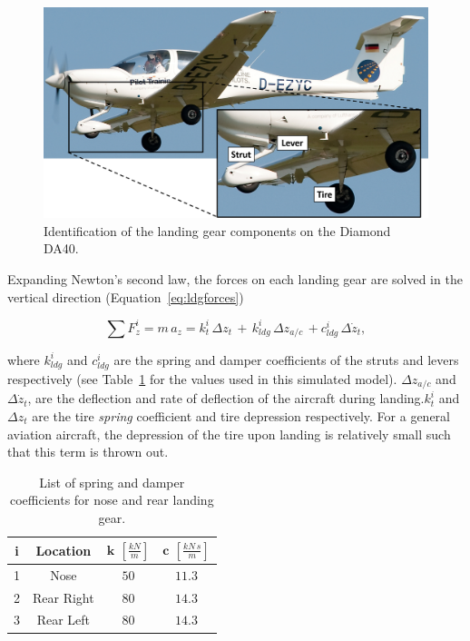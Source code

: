 \documentclass[12pt]{report}
\begin{document}
\begin{figure}[!ht]\label{fig:ldg}
  \centering
  \includegraphics[width=.75\linewidth]{Figures/LandingGear.png}
  \caption{Identification of the landing gear components on the Diamond DA40.}
\end{figure}

Expanding Newton's second law, the forces on each landing gear are solved in the vertical direction (Equation~\ref{eq:ldgforces})

\begin{equation}
  \sum F^i_z = m\,a_z = k^i_t\, \Delta z_t\, + \, k^i_{ldg}\, \Delta z_{a/c}\, + c^i_{ldg}\, \Delta \dot{z}_t,
  \label{eq:ldgforces}
\end{equation}

where \(k^i_{ldg}\) and \(c^i_{ldg}\) are the spring and damper coefficients of the struts and levers respectively (see Table~\ref{tbl:ldgcoeff} for the values used in this simulated model). \(\Delta z_{a/c}\) and \(\Delta \dot{z}_t\), are the deflection and rate of deflection of the aircraft during landing.\( k^i_t \) and \(\Delta z_t\) are the tire \textit{spring} coefficient and tire depression respectively. For a general aviation aircraft, the depression of the tire upon landing is relatively small such that this term is thrown out.

\begin{table}[!ht]\label{tbl:ldgcoeff}
  \caption{List of spring and damper coefficients for nose and rear landing gear.}
  \centering
  \begin{tabular}{cccc}
    \toprule
    \textbf{i} & \textbf{Location} & \(\mathbf{k}\) \(  \left[\frac{kN}{m}\right]\) & \(\mathbf{c}\) \( \left[\frac{kN\,s}{m}\right]\) \\
    \midrule
    1          & Nose              & \(50\)                                         & \(11.3\)                                         \\
    2          & Rear Right        & \(80\)                                         & \(14.3\)                                         \\
    3          & Rear Left         & \(80\)                                         & \(14.3\)                                         \\
    \bottomrule
  \end{tabular}
\end{table}
\end{document}
